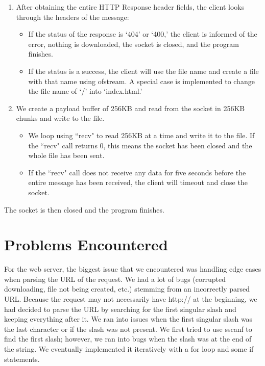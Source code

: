 \documentclass{article}
\begin{document}
\begin{enumerate}
            \item After obtaining the entire HTTP Response header fields, the client
                looks through the headers of the message:
                \begin{itemize}
                    \item If the status of the response is `404' or `400,' the client
                        is informed of the error, nothing is downloaded, the socket is
                        closed, and the program finishes.
                    \item If the status is a success, the client will use the file name
                        and create a file with that name using ofstream. A special case
                        is implemented to change the file name of `/' into
                        `index.html.'
                \end{itemize}
            \item We create a payload buffer of 256KB and read from the socket in 256KB
                chunks and write to the file.
                \begin{itemize}
                    \item We loop using ``recv" to read 256KB at a time and write
                        it to the file. If the ``recv" call returns 0, this means the
                        socket has been closed and the whole file has been sent.
                    
                    \item If the ``recv" call does not receive any data for five seconds
                        before the entire message has been received, the
                        client will timeout and close the socket.
                        
                \end{itemize}
        \end{enumerate}
        The socket is then closed and the program finishes.

\section{Problems Encountered}
    For the web server, the biggest issue that we encountered was handling edge
    cases when parsing the URL of the request. We had a lot of bugs (corrupted
    downloading, file not being created, etc.) stemming from an incorrectly
    parsed URL. Because the request may not necessarily have http:// at the
    beginning, we had decided to parse the URL by searching for the first
    singular slash and keeping everything after it. We ran into issues when the
    first singular slash was the last character or if the slash was not
    present. We first tried to use sscanf to find the first slash; however, we
    ran into bugs when the slash was at the end of the string. We eventually
    implemented it iteratively with a for loop and some if statements.
\end{document}

